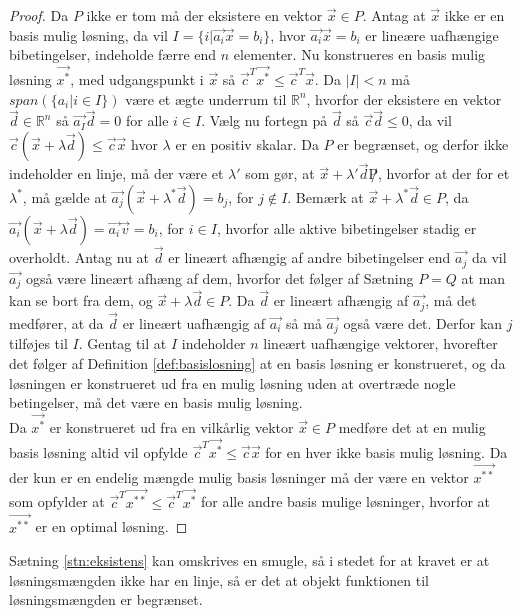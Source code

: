 \begin{proof}
Da $P$ ikke er tom må der eksistere en vektor $\vec{x} \in P$.
Antag at $\vec{x}$ ikke er en basis mulig løsning, da vil $I = \{i | \vec{a_i}\vec{x} = b_i\}$, hvor $\vec{a_i}\vec{x}=b_i$ er lineære uafhængige bibetingelser, indeholde færre end $n$ elementer. 
Nu konstrueres en basis mulig løsning $\vec{x^*}$, med udgangspunkt i $\vec{x}$ så $\vec{c}^T\vec{x^*}\leq \vec{c}^T\vec{x}$.
Da $|I|<n $ må $span(\{a_i | i \in I\})$ være et ægte underrum til $\mathds{R}^n$, hvorfor der eksistere en vektor $\vec{d} \in \mathds{R}^n$ så $\vec{a_I}\vec{d}=0$ for alle $i \in I$. 
Vælg nu fortegn på $\vec{d}$ så $\vec{c}\vec{d} \leq 0$, da vil $\vec{c}(\vec{x}+\lambda\vec{d}) \leq \vec{c}\vec{x}$ hvor $\lambda$ er en positiv skalar.
Da $P$ er begrænset, og derfor ikke indeholder en linje, må der være et $\lambda'$ som gør, at $\vec{x}+\lambda '\vec{d} \not P$, hvorfor at der for et $\lambda^*$, må gælde at $\vec{a_j}(\vec{x}+\lambda^* \vec{d}) = b_j$, for $j \notin I$.
Bemærk at $\vec{x}+\lambda^*\vec{d} \in P$, da $\vec{a_i}(\vec{x}+\lambda\vec{d})= \vec{a_i}\vec{v} = b_i$, for $i \in I$, hvorfor alle aktive bibetingelser stadig er overholdt.
Antag nu at $\vec{d}$ er lineært afhængig af andre bibetingelser end $\vec{a_j}$ da vil $\vec{a_j}$ også være lineært afhæng af dem, hvorfor det følger af Sætning $P=Q$ at man kan se bort fra dem, og $\vec{x}+\lambda \vec{d} \in P$. 
Da $\vec{d}$ er lineært afhængig af $\vec{a_j}$, må det medfører, at da $\vec{d}$ er lineært uafhængig af $\vec{a_i}$ så må $\vec{a_j}$ også være det. 
Derfor kan $j$ tilføjes til $I$. 
Gentag til at $I$ indeholder $n$ lineært uafhængige vektorer, hvorefter det følger af Definition \ref{def:basislosning} at en basis løsning er konstrueret, og da løsningen er konstrueret ud fra en mulig løsning uden at overtræde nogle betingelser, må det være en basis mulig løsning.\\
Da $\vec{x^*}$ er konstrueret ud fra en vilkårlig vektor $\vec{x}\in P$ medføre det at en mulig basis løsning altid vil opfylde $\vec{c}^T\vec{x^*} \leq \vec{c}\vec{x}$ for en hver ikke basis mulig løsning. 
Da der kun er en endelig mængde mulig basis løsninger må der være en vektor $\vec{x^{**}}$ som opfylder at $\vec{c}^T\vec{x^{**}}\leq \vec{c}^T\vec{x^*}$ for alle andre basis mulige løsninger, hvorfor at $\vec{x^{**}}$ er en optimal løsning.
\end{proof}
Sætning \ref{stn:eksistens} kan omskrives en smugle, så i stedet for at kravet er at løsningsmængden ikke har en linje, så er det at objekt funktionen til løsningsmængden er begrænset.
